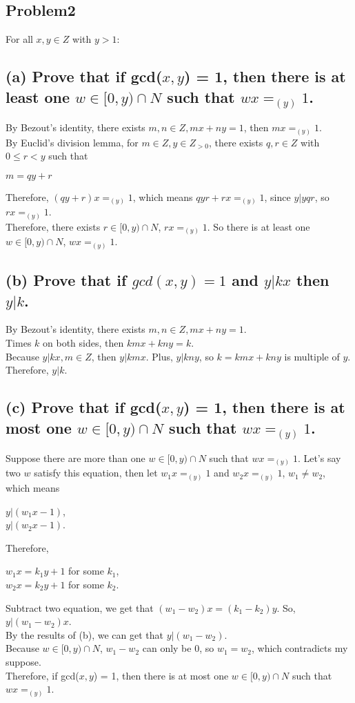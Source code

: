 \documentclass[]{article}
\begin{document}
\begin{spacing}{1.5}
\section*{Problem2}
For all $ x, y \in Z $ with $ y > 1 :$
\subsection*{(a) Prove that if gcd($x, y $) = 1, then there is at least one $ w \in  [0, y) \cap N$ such that $ wx = _{(y)}1 $.}

By Bezout's identity, there exists $ m,n \in Z, mx+ny=1 $, then $ mx = _{(y)}1$.\\
By Euclid's division lemma, for $ m \in Z, y \in Z_{>0} $, there exists $ q, r \in Z $ with $ 0 \leq r < y $ such that
\begin{center}
	$ m = qy + r $
\end{center}
Therefore, $ (qy + r)x  = _{(y)}1$, which means $  qyr + rx  = _{(y)}1$, since $ y | yqr $, so $ rx  = _{(y)}1 $.\\
Therefore, there exists $ r \in  [0, y) \cap N $, $ rx  = _{(y)}1 $.
So there is at least one $ w \in  [0, y) \cap N $, $ wx  = _{(y)}1 $.

\subsection*{(b) Prove that if $ gcd(x, y) = 1 $ and $ y|kx $ then $ y|k $.}
By Bezout's identity, there exists $ m,n \in Z, mx+ny=1 $. \\
Times $ k $ on both sides, then $ kmx + kny = k$.\\
Because $ y|kx, m \in Z$, then $ y|kmx $. Plus, $ y|kny $, so $ k = kmx+kny $ is multiple of $ y $.\\
Therefore, $ y|k $.

\subsection*{(c) Prove that if gcd($x, y $) = 1, then there is at most one $ w \in  [0, y) \cap N$ such that $ wx = _{(y)}1 $.}
Suppose there are more than one $ w \in  [0, y) \cap N$ such that $ wx = _{(y)}1 $. Let's say two $ w $ satisfy this equation, then let $ w_1x = _{(y)}1 $ and $ w_2x = _{(y)}1 $, $ w_1 \neq w_2 $, which means 
\begin{center}
	$ y|(w_1x-1) $,\\
	$ y|(w_2x-1) $.
\end{center}
Therefore,
\begin{center}
	$ w_1x = k_1y+1 $ for some $ k_1 $,\\
	$ w_2x = k_2y+1 $ for some $ k_2 .$
\end{center}
Subtract two equation, we get that $ (w_1 - w_2)x = (k_1 - k_2)y $. So, $ y|(w_1-w_2)x $.\\
By the results of (b), we can get that $ y|(w_1-w_2) $.\\
Because  $ w \in  [0, y) \cap N$, $ w_1-w_2 $ can only be $ 0 $, so $ w_1 = w_2 $, which contradicts my suppose.\\
Therefore,  if gcd($x, y $) = 1, then there is at most one $ w \in  [0, y) \cap N$ such that $ wx = _{(y)}1 $.


\end{spacing}
\end{document}
